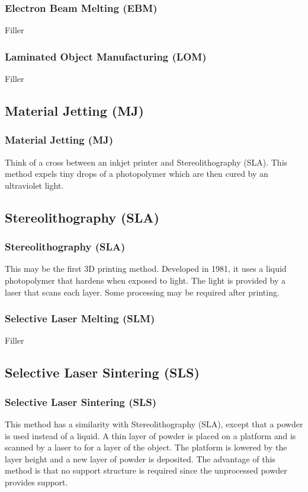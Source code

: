 \documentclass[english,10pt]{beamer}
\begin{document}
\begin{frame}
  \frametitle{Electron Beam Melting (EBM)}
  Filler
\end{frame}

\begin{frame}
  \frametitle{Laminated Object Manufacturing (LOM)}
  Filler
\end{frame}

\subsection{Material Jetting (MJ)}
\begin{frame}
  \frametitle{Material Jetting (MJ)}
  Think of a cross between an inkjet printer and Stereolithography (SLA).  This method expels tiny drops of a photopolymer which are then cured by an ultraviolet light.
\end{frame}

\subsection{Stereolithography (SLA)}
\begin{frame}
  \frametitle{Stereolithography (SLA)}
  This may be the first 3D printing method.  Developed in 1981, it uses a liquid photopolymer that hardens when exposed to light.  The light is provided by a laser that scans each layer.  Some processing may be required after printing.
\end{frame}

\begin{frame}
  \frametitle{Selective Laser Melting (SLM)}
  Filler
\end{frame}

\subsection{Selective Laser Sintering (SLS)}
\begin{frame}
  \frametitle{Selective Laser Sintering (SLS)}
  This method has a similarity with Stereolithography (SLA), except that a powder is used instead of a liquid.  A thin layer of powder is placed on a platform and is scanned by a laser to for a layer of the object.  The platform is lowered by the layer height and a new layer of powder is deposited.  The advantage of this method is that no support structure is required since the unprocessed powder provides support.
\end{frame}
\end{document}
